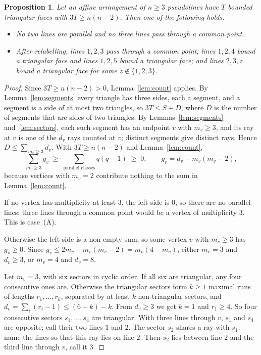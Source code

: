 \documentclass[11pt]{article}
\newtheorem{proposition}[lemma]{Proposition}
\theoremstyle{definition}
\theoremstyle{remark}
\begin{document}
\begin{proposition}\label{prop:split}
Let an affine arrangement of $n \ge 3$ pseudolines have $T$ bounded triangular faces with
$3T \ge n(n-2)$. Then one of the following holds.
\begin{itemize}
\item[(A)] No two lines are parallel and no three lines pass through a common point.
\item[(B)] After relabelling, lines $1, 2, 3$ pass through a common point; lines $1, 2, 4$ bound a
  triangular face and lines $1, 2, 5$ bound a triangular face; and lines $2, 3, z$ bound a
  triangular face for some $z \notin \{1, 2, 3\}$.
\end{itemize}
\end{proposition}
\begin{proof}
Since $3T \ge n(n-2) > 0$, Lemma~\ref{lem:count} applies. By Lemma~\ref{lem:segments} every
triangle has three sides, each a segment, and a segment is a side of at most two triangles, so
$3T \le S + D$, where $D$ is the number of segments that are sides of two triangles. By
Lemmas~\ref{lem:segments} and~\ref{lem:sectors}, each such segment has an endpoint $v$ with
$m_v \ge 3$, and its ray at $v$ is one of the $d_v$ rays counted at $v$; distinct segments give
distinct rays. Hence $D \le \sum_{m_v \ge 3} d_v$. With $3T \ge n(n-2)$ and
Lemma~\ref{lem:count},
\[
  \sum_{m_v \ge 3} g_v \;\ge\; \sum_{\text{parallel classes}} q(q-1) \;\ge\; 0,
  \qquad g_v = d_v - m_v(m_v - 2),
\]
because vertices with $m_v = 2$ contribute nothing to the sum in Lemma~\ref{lem:count}.

If no vertex has multiplicity at least $3$, the left side is $0$, so there are no parallel lines;
three lines through a common point would be a vertex of multiplicity $3$. This is case~(A).

Otherwise the left side is a non-empty sum, so some vertex $v$ with $m_v \ge 3$ has $g_v \ge 0$.
Since $g_v \le 2m_v - m_v(m_v-2) = m_v(4 - m_v)$, either $m_v = 3$ and $d_v \ge 3$, or $m_v = 4$ and
$d_v = 8$.

Let $m_v = 3$, with six sectors in cyclic order. If all six are triangular, any four consecutive
ones are. Otherwise the triangular sectors form $k \ge 1$ maximal runs of lengths $r_1, \dots, r_k$,
separated by at least $k$ non-triangular sectors, and $d_v = \sum_i (r_i - 1) \le (6 - k) - k$.
From $d_v \ge 3$ we get $k = 1$ and $r_1 \ge 4$. So four consecutive sectors $s_1, \dots, s_4$ are
triangular. With three lines through $v$, $s_1$ and $s_4$ are opposite; call their two lines $1$
and $2$. The sector $s_2$ shares a ray with $s_1$; name the lines so that this ray lies on line
$2$. Then $s_2$ lies between line $2$ and the third line through $v$, call it $3$.


\end{proof}
\end{document}
